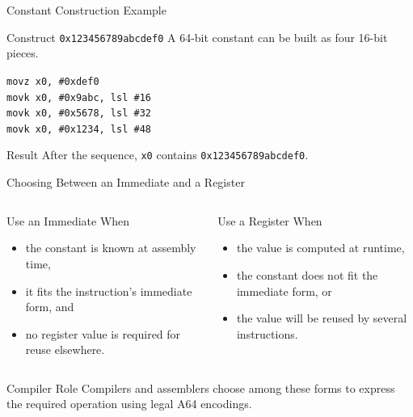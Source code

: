 \documentclass[aspectratio=169,11pt,t]{beamer}
\newcommand{\hex}[1]{\texttt{0x#1}}
\newcommand{\code}[1]{\texttt{#1}}
\begin{document}
\begin{frame}{Constant Construction Example}
\begin{block}{Construct \hex{123456789abcdef0}}
A 64-bit constant can be built as four 16-bit pieces.
\end{block}
\vspace{0.15cm}
\large
\hspace{2.8cm}\mbox{\code{movz x0, \#0xdef0}}\\[0.10cm]
\hspace{2.8cm}\mbox{\code{movk x0, \#0x9abc, lsl \#16}}\\[0.10cm]
\hspace{2.8cm}\mbox{\code{movk x0, \#0x5678, lsl \#32}}\\[0.10cm]
\hspace{2.8cm}\mbox{\code{movk x0, \#0x1234, lsl \#48}}
\normalsize
\vspace{0.2cm}
\begin{block}{Result}
After the sequence, \code{x0} contains \hex{123456789abcdef0}.
\end{block}
\end{frame}




\begin{frame}{Choosing Between an Immediate and a Register}
\begin{columns}[T,onlytextwidth]
\begin{block}{Use an Immediate When}
\begin{itemize}
\item the constant is known at assembly time,
\item it fits the instruction's immediate form, and
\item no register value is required for reuse elsewhere.
\end{itemize}
\end{block}
\begin{block}{Use a Register When}
\begin{itemize}
\item the value is computed at runtime,
\item the constant does not fit the immediate form, or
\item the value will be reused by several instructions.
\end{itemize}
\end{block}
\end{columns}
\vspace{0.2cm}
\begin{block}{Compiler Role}
Compilers and assemblers choose among these forms to express the required operation using legal A64 encodings.
\end{block}
\end{frame}
\end{document}
